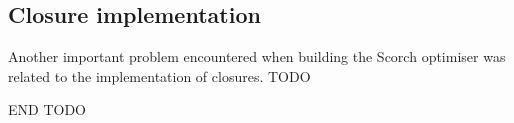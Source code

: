\documentclass[a4paper,12pt,twoside]{../includes/ThesisStyle}
\begin{document}
\subsection{Closure implementation}

Another important problem encountered when building the Scorch optimiser was related to the implementation of closures.
TODO



END TODO


\ifx\wholebook\relax\else
    
\end{document}
